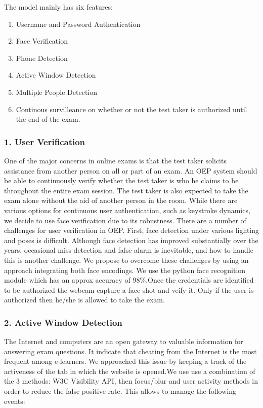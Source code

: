 \documentclass[12pt]{report}
\begin{document}
The model mainly has six features:\\

\begin{enumerate}
\item Username and Password Authentication
\item Face Verification
\item Phone Detection
\item Active Window Detection
\item Multiple People Detection
\item Continous survilleance on whether or not the test taker is authorized until the end of the exam.
\end{enumerate}
\subsubsection{1. User Verification}
One of the major concerns in online exams is that the test
taker solicits assistance from another person on all or part
of an exam. An OEP system should be able to continuously
verify whether the test taker is who he claims to be throughout
the entire exam session. The test taker is also expected to
take the exam alone without the aid of another person in
the room. While there are various options for continuous user
authentication, such as keystroke dynamics, we decide to use
face verification due to its robustness.
There are a number of challenges for user verification in
OEP. First, face detection under various lighting and poses
is difficult. 
Although face detection has improved substantially
over the years, occasional miss detection and false alarm is
inevitable, and how to handle this is another challenge.
We propose to overcome these challenges by using an
approach integrating both face encodings. We use the python face recognition module which has an approx accuracy of 98\%.Once the credentials are identified to be authorized the webcam capture a face shot and veify it. Only if the user is authorized then he/she is allowed to take the exam.\\

\subsubsection{2. Active Window Detection}
The Internet and computers are an open gateway to valuable
information for answering exam questions. It
indicate that cheating from the Internet is the most frequent
among e-learners. We approached this issue by keeping a track of the activeness of the tab in which the website is opened.We use use a combination of the 3 methods: W3C Visibility API, then focus/blur and user activity methods in order to reduce the false positive rate. This allows to manage the following events:\\
\end{document}
